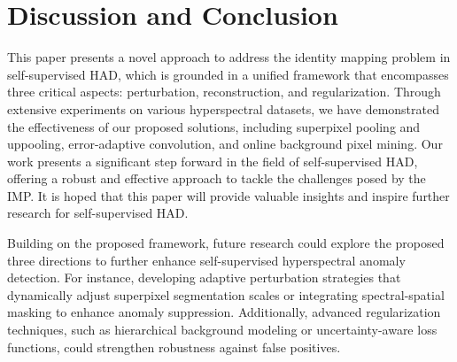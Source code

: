 \section{Discussion and Conclusion}\label{Discussion and Conclusion}


This paper presents a novel approach to address the identity mapping problem in self-supervised HAD, which is grounded in a unified framework that encompasses three critical aspects: perturbation, reconstruction, and regularization. Through extensive experiments on various hyperspectral datasets, we have demonstrated the effectiveness of our proposed solutions, including superpixel pooling and uppooling, error-adaptive convolution, and online background pixel mining. Our work presents a significant step forward in the field of self-supervised HAD, offering a robust and effective approach to tackle the challenges posed by the IMP. It is hoped that this paper will provide valuable insights and inspire further research for self-supervised HAD.


Building on the proposed framework, future research could explore the proposed three directions to further enhance self-supervised hyperspectral anomaly detection. For instance, developing adaptive perturbation strategies that dynamically adjust superpixel segmentation scales or integrating spectral-spatial masking to enhance anomaly suppression. Additionally, advanced regularization techniques, such as hierarchical background modeling or uncertainty-aware loss functions, could strengthen robustness against false positives. 



